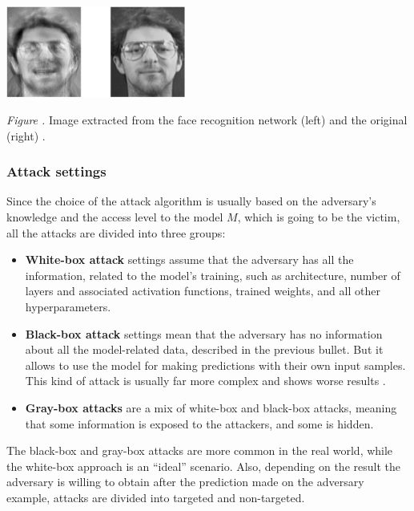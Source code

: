 \documentclass[14pt,a4paper]{extarticle}
\newcounter{e}
\newcounter{pic}
\newcommand{\pic}[1]{\refstepcounter{pic} \vspace{-0.3cm}\textit{Figure \arabic{pic}\label{#1}.}}
\numberwithin{equation}{section}
\numberwithin{figure}{section}
\begin{document}
\begin{center}
    \includegraphics[height=3cm]{images/model-inversion.png}
\end{center}
\begin{center}
    \pic{model-inversion} Image extracted from the face recognition network (left) and the original (right) \cite{model-inversion}.
\end{center}



\subsubsection{Attack settings}
Since the choice of the attack algorithm is usually based on the adversary’s knowledge and the access level to the model $M$, which is going to be the victim, all the attacks are divided into three groups:
\begin{itemize}
    \item \textbf{White-box attack} settings assume that the adversary has all the information, related to the model’s training, such as architecture, number of layers and associated activation functions, trained weights, and all other \newline
    hyperparameters.
    \item \textbf{Black-box attack} settings mean that the adversary has no information about all the model-related data, described in the previous bullet. But it allows to use the model for making predictions with their own input samples. This kind of attack is usually far more complex and shows worse results \cite{black-box}.
    \item \textbf{Gray-box attacks} are a mix of white-box and black-box attacks, meaning that some information is exposed to the attackers, and some is hidden.
\end{itemize}

The black-box and gray-box attacks are more common in the real world, while the white-box approach is an ``ideal'' scenario.
Also, depending on the result the adversary is willing to obtain after the prediction made on the adversary example, attacks are divided into targeted and non-targeted.
\end{document}
